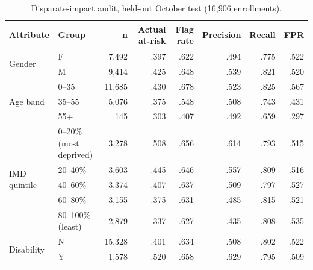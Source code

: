 \documentclass[10pt,letterpaper]{article}
\begin{document}
\begin{table}[H]\centering\small
\caption{Disparate-impact audit, held-out October test (16,906 enrollments).}\label{tab:audit}
\begin{tabular}{@{}llrrrrrr@{}}
\toprule
\textbf{Attribute} & \textbf{Group} & \textbf{n} & \textbf{Actual at-risk} & \textbf{Flag rate} & \textbf{Precision} & \textbf{Recall} & \textbf{FPR} \\ \midrule
\multirow{2}{*}{Gender} & F & 7,492 & .397 & .622 & .494 & .775 & .522 \\
 & M & 9,414 & .425 & .648 & .539 & .821 & .520 \\ \midrule
\multirow{3}{*}{Age band} & 0--35 & 11,685 & .430 & .678 & .523 & .825 & .567 \\
 & 35--55 & 5,076 & .375 & .548 & .508 & .743 & .431 \\
 & 55+ & 145 & .303 & .407 & .492 & .659 & .297 \\ \midrule
\multirow{5}{*}{IMD quintile} & 0--20\% (most deprived) & 3,278 & .508 & .656 & .614 & .793 & .515 \\
 & 20--40\% & 3,603 & .445 & .646 & .557 & .809 & .516 \\
 & 40--60\% & 3,374 & .407 & .637 & .509 & .797 & .527 \\
 & 60--80\% & 3,155 & .375 & .631 & .485 & .815 & .521 \\
 & 80--100\% (least) & 2,879 & .337 & .627 & .435 & .808 & .535 \\ \midrule
\multirow{2}{*}{Disability} & N & 15,328 & .401 & .634 & .508 & .802 & .522 \\
 & Y & 1,578 & .520 & .658 & .629 & .795 & .509 \\
\bottomrule
\end{tabular}
\end{table}
\end{document}

